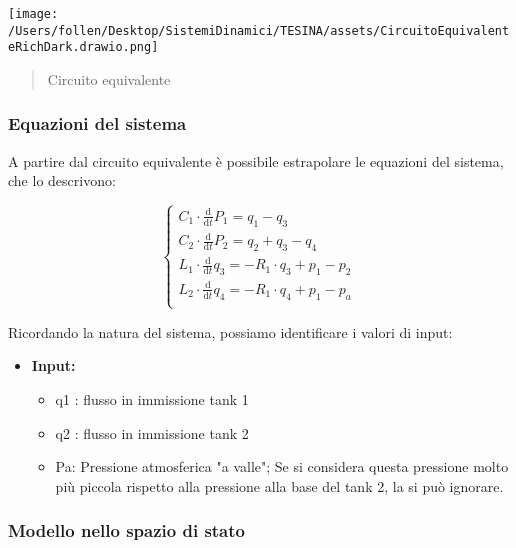 \documentclass[
]{article}
\begin{document}
\texttt{[image: /Users/follen/Desktop/SistemiDinamici/TESINA/assets/CircuitoEquivalenteRichDark.drawio.png]}

\begin{quote}
Circuito equivalente
\end{quote}

\hypertarget{equazioni-del-sistema}{%
\subsubsection{Equazioni del sistema}\label{equazioni-del-sistema}}

A partire dal circuito equivalente è possibile estrapolare le equazioni
del sistema, che lo descrivono:

\begin{equation}
    \begin{cases}
      C_{1} \cdot \frac{\mathrm{d} }{\mathrm{d} t}P_{1} = q_{1} - q_{3}\\
      C_{2} \cdot \frac{\mathrm{d} }{\mathrm{d} t}P_{2} = q_{2} + q_{3} - q_{4}\\
      L_{1} \cdot \frac{\mathrm{d} }{\mathrm{d} t}q_{3} = -R_{1} \cdot q_{3} + p_{1} - p_{2}\\
      L_{2} \cdot \frac{\mathrm{d} }{\mathrm{d} t}q_{4} = -R_{1} \cdot q_{4} + p_{1} - p_{a}\\

    \end{cases}\,
\end{equation}

Ricordando la natura del sistema, possiamo identificare i valori di
input:

\begin{itemize}
\item
  \textbf{Input:}

  \begin{itemize}
  \item
    q1 : flusso in immissione tank 1
  \item
    q2 : flusso in immissione tank 2
  \item
    Pa: Pressione atmosferica "a valle"; Se si considera questa
    pressione molto più piccola rispetto alla pressione alla base del
    tank 2, la si può ignorare.
  \end{itemize}
\end{itemize}

\hypertarget{modello-nello-spazio-di-stato}{%
\subsubsection{Modello nello spazio di
stato}\label{modello-nello-spazio-di-stato}}
\end{document}
